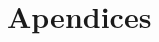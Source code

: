 \documentclass[11pt,a4paper,spanish]{book}
\numberwithin{equation}{chapter}
\numberwithin{figure}{chapter}
\begin{document}
\cite{PIMENTEL2016744} \cite{da_S_Bessa_2023}




\appendix
\chapter{Apendices}
\end{document}
